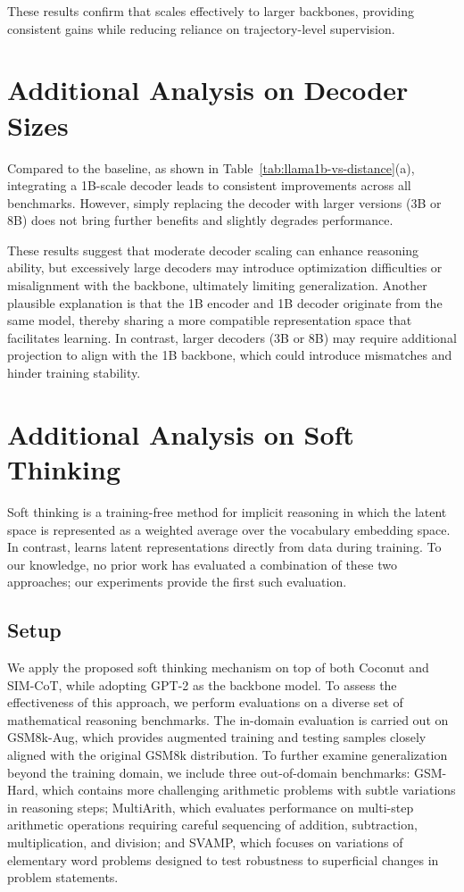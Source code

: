 These results confirm that \methodname scales effectively to larger backbones, providing consistent gains while reducing reliance on trajectory-level supervision.

\section{Additional Analysis on Decoder Sizes}
\label{appendix:decoder_size}

Compared to the baseline, as shown in Table~\ref{tab:llama1b-vs-distance}(a), integrating a 1B-scale decoder leads to consistent improvements across all benchmarks.  
However, simply replacing the decoder with larger versions (3B or 8B) does not bring further benefits and slightly degrades performance.


These results suggest that moderate decoder scaling can enhance reasoning ability, but excessively large decoders may introduce optimization difficulties or misalignment with the backbone, ultimately limiting generalization.  
Another plausible explanation is that the 1B encoder and 1B decoder originate from the same model, thereby sharing a more compatible representation space that facilitates learning.  
In contrast, larger decoders (3B or 8B) may require additional projection to align with the 1B backbone, which could introduce mismatches and hinder training stability.


\section{Additional Analysis on Soft Thinking}
\label{appendix:softthinking}

Soft thinking \citep{zhang2025soft, wu2025llms} is a training-free method for implicit reasoning in which the latent space is represented as a weighted average over the vocabulary embedding space.  
In contrast, \methodname learns latent representations directly from data during training.  
To our knowledge, no prior work has evaluated a combination of these two approaches; our experiments provide the first such evaluation.

\subsection{Setup}
We apply the proposed soft thinking mechanism on top of both Coconut and SIM-CoT, while adopting GPT-2 as the backbone model.
To assess the effectiveness of this approach, we perform evaluations on a diverse set of mathematical reasoning benchmarks.
The in-domain evaluation is carried out on GSM8k-Aug, which provides augmented training and testing samples closely aligned with the original GSM8k distribution.
To further examine generalization beyond the training domain, we include three out-of-domain benchmarks: GSM-Hard, which contains more challenging arithmetic problems with subtle variations in reasoning steps; MultiArith, which evaluates performance on multi-step arithmetic operations requiring careful sequencing of addition, subtraction, multiplication, and division; and SVAMP, which focuses on variations of elementary word problems designed to test robustness to superficial changes in problem statements.



